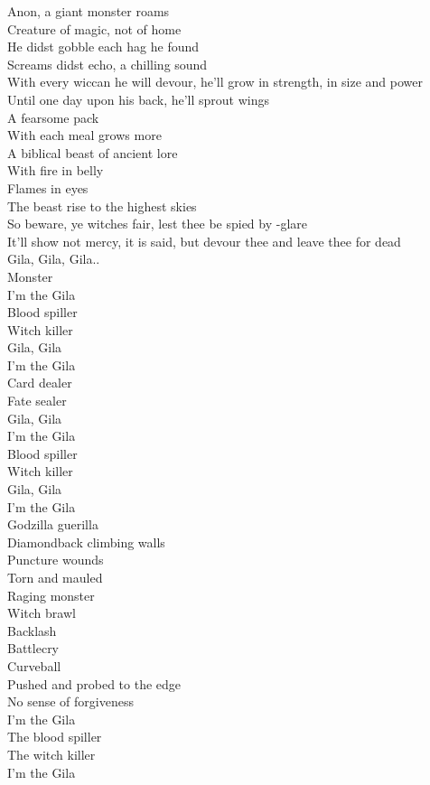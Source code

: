 
Anon, a giant monster roams \\
Creature of magic, not of home \\
He didst gobble each hag he found \\
Screams didst echo, a chilling sound \\
With every wiccan he will devour, he'll grow in strength, in size and power \\
Until one day upon his back, he'll sprout wings \\
A fearsome pack \\
With each meal  grows more \\
A biblical beast of ancient lore \\
With fire in belly \\
Flames in eyes \\
The beast rise to the highest skies \\
So beware, ye witches fair, lest thee be spied by -glare \\
It'll show not mercy, it is said, but devour thee and leave thee for dead \\

Gila, Gila, Gila.. \\
Monster \\

I'm the Gila \\
Blood spiller \\
Witch killer \\
Gila, Gila \\
I'm the Gila \\
Card dealer \\
Fate sealer \\
Gila, Gila \\
I'm the Gila \\
Blood spiller \\
Witch killer \\
Gila, Gila \\
I'm the Gila \\
Godzilla guerilla \\

Diamondback climbing walls \\
Puncture wounds \\
Torn and mauled \\
Raging monster \\
Witch brawl \\
Backlash \\
Battlecry \\
Curveball \\
Pushed and probed to the edge \\
No sense of forgiveness \\
I'm the Gila \\
The blood spiller \\
The witch killer \\
I'm the Gila \\

